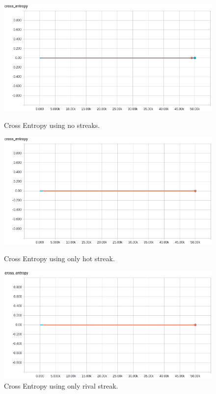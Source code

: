 \documentclass{article} %
\begin{document}
\begin{figure}[!htb]
  \includegraphics[width=\linewidth]{plots/model1/oneshot/streak-/crossentropy.png}
  \caption{Cross Entropy using no streaks.}\label{fig:oneshot--crossentropy}
\endminipage\hfill
{}
  \includegraphics[width=\linewidth]{plots/model1/oneshot/streak-h/crossentropy.png}
  \caption{Cross Entropy using only hot streak.}\label{fig:oneshot-h-crossentropy}
\endminipage\hfill
{}%
  \includegraphics[width=\linewidth]{plots/model1/oneshot/streak-r/crossentropy.png}
  \caption{Cross Entropy using only rival streak.}\label{fig:oneshot-r-crossentropy}

\end{figure}
\end{document}
